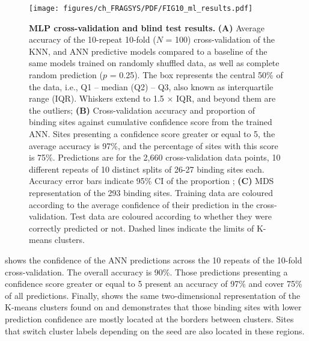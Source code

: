 \begin{figure}[ht!]
    \centering
    \texttt{[image: figures/ch\_FRAGSYS/PDF/FIG10\_ml\_results.pdf]}
    \caption[MLP cross-validation and blind test results]{\textbf{MLP cross-validation and blind test results.} \textbf{(A)} Average accuracy of the 10-repeat 10-fold ($N$ = 100) cross-validation of the KNN, and ANN predictive models compared to a baseline of the same models trained on randomly shuffled data, as well as complete random prediction ($p$ = 0.25). The box represents the central 50\% of the data, i.e., Q1 – median (Q2) – Q3, also known as interquartile range (IQR). Whiskers extend to 1.5 $\times$ IQR, and beyond them are the outliers; \textbf{(B)} Cross-validation accuracy and proportion of binding sites against cumulative confidence score from the trained ANN. Sites presenting a confidence score greater or equal to 5, the average accuracy is 97\%, and the percentage of sites with this score is 75\%. Predictions are for the 2,660 cross-validation data points, 10 different repeats of 10 distinct splits of 26-27 binding sites each. Accuracy error bars indicate 95\% CI of the proportion \cite{WILSON_197_PROP_CI}; \textbf{(C)} MDS representation of the 293 binding sites. Training data are coloured according to the average confidence of their prediction in the cross-validation. Test data are coloured according to whether they were correctly predicted or not. Dashed lines indicate the limits of K-means clusters.}
    \label{fig:MLP_CV_blind_test}
\end{figure}

 shows the confidence of the ANN predictions across the 10 repeats of the 10-fold cross-validation. The overall accuracy is 90\%. Those predictions presenting a confidence score greater or equal to 5 present an accuracy of 97\% and cover 75\% of all predictions. Finally,  shows the same two-dimensional representation of the K-means clusters found on  and demonstrates that those binding sites with lower prediction confidence are mostly located at the borders between clusters. Sites that switch cluster labels depending on the seed are also located in these regions.

